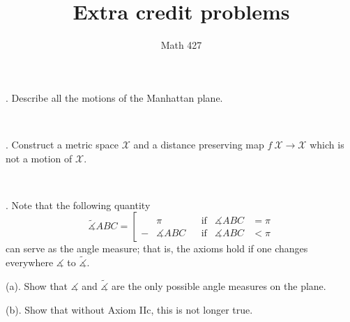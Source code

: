 \documentclass[oneside,a4paper]{article}
\begin{document}
\title{Extra credit problems}
\author{Math 427}
\date{}
\maketitle

\textit{}

. Describe all the motions of the Manhattan plane.

\ 

. Construct a metric space $\mathcal X$ and a distance preserving map $f\:\mathcal X\to \mathcal X$ which is not a motion of $\mathcal X$.

\ 

. Note that the following quantity 
$$\tilde
\measuredangle ABC=\left[
\begin{aligned}
&\pi&&\text{if}&\measuredangle ABC&=\pi
\\
-&\measuredangle ABC&&\text{if}&\measuredangle ABC&<\pi
\end{aligned}
\right.$$
can serve as the angle measure; 
that is, the axioms hold if one changes everywhere $\measuredangle$ to $\tilde\measuredangle$.

\noi (a). Show that $\measuredangle$ and $\tilde\measuredangle$ are the only possible angle measures on the plane. 

\noi (b). Show that without Axiom IIc, this is not longer true.
\end{document}
